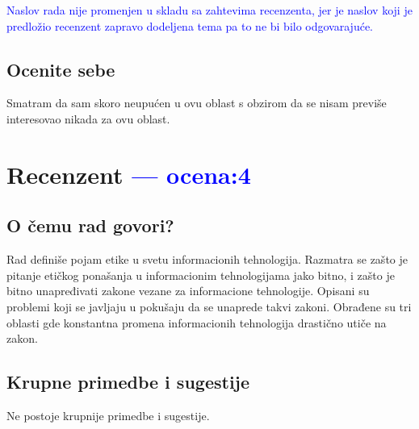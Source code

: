\documentclass[a4paper]{report}
\newcommand{\odgovor}[1]{\textcolor{blue}{#1}}
\begin{document}
\odgovor{Naslov rada nije promenjen u skladu sa zahtevima recenzenta, jer je naslov koji je predložio recenzent zapravo dodeljena tema pa to ne bi bilo odgovarajuće.}

\section{Ocenite sebe}
Smatram da sam skoro neupućen u ovu oblast s obzirom da se nisam previše interesovao nikada za ovu oblast.

\chapter{Recenzent \odgovor{--- ocena:4} }


\section{O čemu rad govori?}
Rad definiše pojam etike u svetu informacionih tehnologija. Razmatra se zašto je pitanje etičkog ponašanja u informacionim tehnologijama jako bitno, i zašto je bitno unapređivati zakone vezane za informacione tehnologije. Opisani su problemi koji se javljaju u pokušaju da se unaprede takvi zakoni. Obrađene su tri oblasti gde konstantna promena informacionih tehnologija drastično utiče na zakon.

\section{Krupne primedbe i sugestije}
Ne postoje krupnije primedbe i sugestije.
\end{document}
